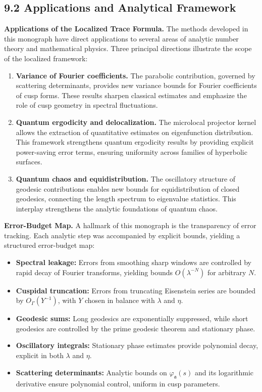 \newpage

\subsection{9.2 Applications and Analytical Framework}

\noindent\textbf{Applications of the Localized Trace Formula.}
The methods developed in this monograph have direct applications to several areas of analytic number theory and mathematical physics. Three principal directions illustrate the scope of the localized framework:

\begin{enumerate}
  \item \textbf{Variance of Fourier coefficients.}  
  The parabolic contribution, governed by scattering determinants, provides new variance bounds for Fourier coefficients of cusp forms. These results sharpen classical estimates and emphasize the role of cusp geometry in spectral fluctuations.

  \item \textbf{Quantum ergodicity and delocalization.}  
  The microlocal projector kernel allows the extraction of quantitative estimates on eigenfunction distribution. This framework strengthens quantum ergodicity results by providing explicit power-saving error terms, ensuring uniformity across families of hyperbolic surfaces.

  \item \textbf{Quantum chaos and equidistribution.}  
  The oscillatory structure of geodesic contributions enables new bounds for equidistribution of closed geodesics, connecting the length spectrum to eigenvalue statistics. This interplay strengthens the analytic foundations of quantum chaos.
\end{enumerate}

\medskip

\noindent\textbf{Error-Budget Map.}
A hallmark of this monograph is the transparency of error tracking. Each analytic step was accompanied by explicit bounds, yielding a structured error-budget map:

\begin{itemize}
  \item \textbf{Spectral leakage:} Errors from smoothing sharp windows are controlled by rapid decay of Fourier transforms, yielding bounds $O(\lambda^{-N})$ for arbitrary $N$.
  \item \textbf{Cuspidal truncation:} Errors from truncating Eisenstein series are bounded by $O_\Gamma(Y^{-1})$, with $Y$ chosen in balance with $\lambda$ and $\eta$.
  \item \textbf{Geodesic sums:} Long geodesics are exponentially suppressed, while short geodesics are controlled by the prime geodesic theorem and stationary phase.
  \item \textbf{Oscillatory integrals:} Stationary phase estimates provide polynomial decay, explicit in both $\lambda$ and $\eta$.
  \item \textbf{Scattering determinants:} Analytic bounds on $\varphi_\mathfrak{a}(s)$ and its logarithmic derivative ensure polynomial control, uniform in cusp parameters.
\end{itemize}

